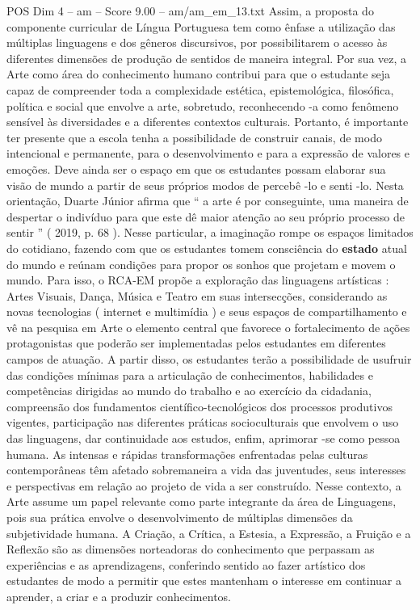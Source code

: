 \begin{textsample}{POS Dim 4 – am – Score 9.00 – am/am\_em\_13.txt}
Assim, a proposta do componente curricular de Língua Portuguesa tem como ênfase a utilização das múltiplas linguagens e dos gêneros discursivos, por possibilitarem o acesso às diferentes dimensões de produção de sentidos de maneira integral.
Por sua vez, a Arte como área do conhecimento humano contribui para que o estudante seja capaz de compreender toda a complexidade estética, epistemológica, filosófica, política e social que envolve a arte, sobretudo, reconhecendo -a como fenômeno sensível às diversidades e a diferentes contextos culturais.
Portanto, é importante ter presente que a escola tenha a possibilidade de construir canais, de modo intencional e permanente, para o desenvolvimento e para a expressão de valores e emoções.
Deve ainda ser o espaço em que os estudantes possam elaborar sua visão de mundo a partir de seus próprios modos de percebê -lo e senti -lo.
Nesta orientação, Duarte Júnior afirma que “ a arte é por conseguinte, uma maneira de despertar o indivíduo para que este dê maior atenção ao seu próprio processo de sentir ” ( 2019, p. 68 ).
Nesse particular, a imaginação rompe os espaços limitados do cotidiano, fazendo com que os estudantes tomem consciência do \textbf{estado} atual do mundo e reúnam condições para propor os sonhos que projetam e movem o mundo.
Para isso, o RCA-EM propõe a exploração das linguagens artísticas : Artes Visuais, Dança, Música e Teatro em suas intersecções, considerando as novas tecnologias ( internet e multimídia ) e seus espaços de compartilhamento e vê na pesquisa em Arte o elemento central que favorece o fortalecimento de ações protagonistas que poderão ser implementadas pelos estudantes em diferentes campos de atuação.
A partir disso, os estudantes terão a possibilidade de usufruir das condições mínimas para a articulação de conhecimentos, habilidades e competências dirigidas ao mundo do trabalho e ao exercício da cidadania, compreensão dos fundamentos científico-tecnológicos dos processos produtivos vigentes, participação nas diferentes práticas socioculturais que envolvem o uso das linguagens, dar continuidade aos estudos, enfim, aprimorar -se como pessoa humana.
As intensas e rápidas transformações enfrentadas pelas culturas contemporâneas têm afetado sobremaneira a vida das juventudes, seus interesses e perspectivas em relação ao projeto de vida a ser construído.
Nesse contexto, a Arte assume um papel relevante como parte integrante da área de Linguagens, pois sua prática envolve o desenvolvimento de múltiplas dimensões da subjetividade humana.
A Criação, a Crítica, a Estesia, a Expressão, a Fruição e a Reflexão são as dimensões norteadoras do conhecimento que perpassam as experiências e as aprendizagens, conferindo sentido ao fazer artístico dos estudantes de modo a permitir que estes mantenham o interesse em continuar a aprender, a criar e a produzir conhecimentos.

\end{textsample}
